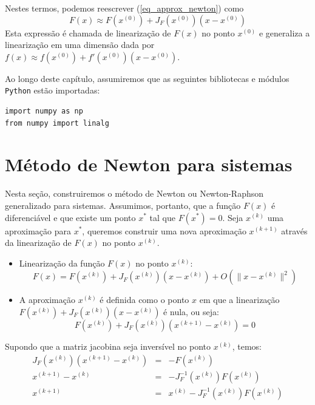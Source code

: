 Nestes termos, podemos reescrever (\ref{eq_approx_newton}) como
$$F(x)\approx F(x^{(0)}) + J_F(x^{(0)}) (x-x^{(0)})$$
Esta expressão é chamada de linearização de $F(x)$ no ponto $x^{(0)}$ e generaliza a linearização em uma dimensão dada por $f(x)\approx f(x^{(0)})+f'(x^{(0)}) (x-x^{(0)})$.

\ifispython
Ao longo deste capítulo, assumiremos que as seguintes bibliotecas e módulos \verb+Python+ estão importadas:
\begin{verbatim}
import numpy as np
from numpy import linalg
\end{verbatim}
\fi

\section{Método de  Newton para sistemas}

Nesta seção, construiremos o método de Newton ou Newton-Raphson generalizado para sistemas. Assumimos, portanto, que a função $F(x)$ é diferenciável e que existe um ponto $x^*$ tal que $F(x^*)=0$. Seja $x^{(k)}$ uma aproximação para $x^*$, queremos construir uma nova aproximação $x^{(k+1)}$ através da linearização de $F(x)$ no ponto $x^{(k)}$.

\begin{itemize}
\item Linearização da função $F(x)$ no ponto $x^{(k)}$: 
  \begin{equation*}
F(x)= F(x^{(k)})+ J_F\left(x^{(k)}\right) \left(x-x^{(k)}\right)  + O\left(\|x-x^{(k)}\|^2\right)    
  \end{equation*}
\item A aproximação $x^{(k)}$ é definida como o ponto $x$ em que a linearização $F(x^{(k)})+ J_F\left(x^{(k)}\right) \left(x-x^{(k)}\right)$ é nula, ou seja:
$$F(x^{(k)})+ J_F\left(x^{(k)}\right) \left(x^{(k+1)}-x^{(k)}\right)=0$$
\end{itemize}

Supondo que a matriz jacobina seja inversível no ponto $x^{(k)}$, temos:
\begin{eqnarray*}
J_F\left(x^{(k)}\right) \left(x^{(k+1)}-x^{(k)}\right)&=&-F(x^{(k)})\\
x^{(k+1)}-x^{(k)}&=&-J_F^{-1}\left(x^{(k)}\right)F(x^{(k)})\\
x^{(k+1)}&=&x^{(k)}-J_F^{-1}\left(x^{(k)}\right)F(x^{(k)})
\end{eqnarray*}

